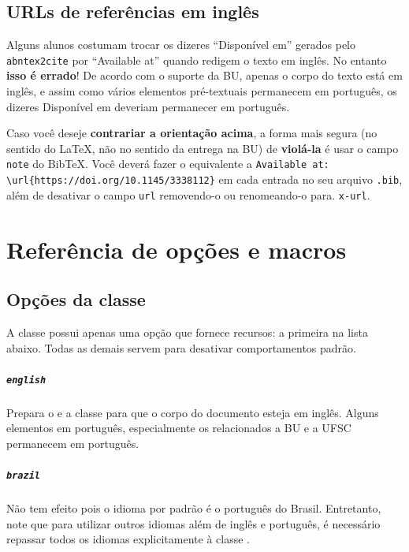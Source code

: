 \documentclass[embeddedlogo]{ufsc-thesis-rn46-2019}
\newcommand{\lacmd}[1]{\texttt{\textbackslash{}#1}}
\begin{document}
\section{URLs de referências em inglês}

Alguns alunos costumam trocar os dizeres ``Disponível em'' gerados pelo
\texttt{abntex2cite} por ``Available at'' quando redigem o texto em inglês. No
entanto \textbf{isso é errado}! De acordo com o suporte da BU, apenas o corpo do
texto está em inglês, e assim como vários elementos pré-textuais permanecem em
português, os dizeres Disponível em deveriam permanecer em português.

Caso você deseje \textbf{contrariar a orientação acima}, a forma mais segura (no
sentido do LaTeX, não no sentido da entrega na BU) de \textbf{violá-la} é usar o
campo \texttt{note} do BibTeX. Você deverá fazer o equivalente a
\texttt{Available at: \lacmd{url}\{https://doi.org/10.1145/3338112\}} em cada
entrada no seu arquivo \texttt{.bib}, além de desativar o campo \texttt{url}
removendo-o ou renomeando-o para. \texttt{x-url}.

\chapter{Referência de opções e macros}
\label{ch:ref}

\section{Opções da classe}

A classe possui apenas uma opção que fornece recursos: a primeira na lista
abaixo. Todas as demais servem para desativar comportamentos padrão.

\paragraph*{\texttt{english}} Prepara o \abnTeX{} e a classe para que o corpo
do documento esteja em inglês. Alguns elementos em português, especialmente os
relacionados a BU e a UFSC permanecem em português.

\paragraph*{\texttt{brazil}} Não tem efeito pois o idioma por padrão é o
português do Brasil. Entretanto, note que para utilizar outros idiomas além de
inglês e português, é necessário repassar todos os idiomas explicitamente à
classe \abnTeX.
\end{document}
